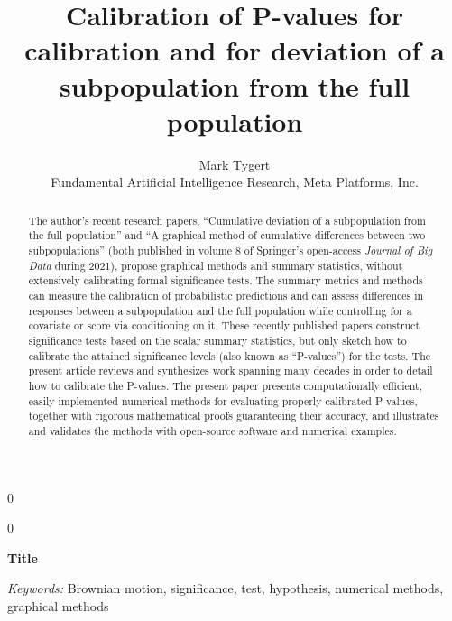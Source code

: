 \documentclass[12pt]{article}
\newcommand{\blind}{0}
\begin{document}
%

\def\spacingset#1{\renewcommand{\baselinestretch}%
{#1}\small\normalsize} \spacingset{1}



\blind
{
  \title{\bf Calibration of P-values for calibration and for deviation
         of a subpopulation from the full population}
  \author{Mark Tygert\\
          Fundamental Artificial Intelligence Research, Meta Platforms, Inc.}
  \maketitle
} \fi

\blind
{
  \bigskip
  \bigskip
  \bigskip
  \begin{center}
    {\LARGE\bf Title}
\end{center}
  \medskip
} \fi

\bigskip
\begin{abstract}
The author's recent research papers,
``Cumulative deviation of a subpopulation from the full population'' and
``A graphical method of cumulative differences between two subpopulations''
(both published in volume 8 of Springer's open-access {\it Journal of Big Data}
during 2021), propose graphical methods and summary statistics,
without extensively calibrating formal significance tests.
The summary metrics and methods can measure the calibration
of probabilistic predictions and can assess differences
in responses between a subpopulation and the full population while controlling
for a covariate or score via conditioning on it.
These recently published papers construct significance tests based
on the scalar summary statistics, but only sketch how to calibrate
the attained significance levels (also known as ``P-values'') for the tests.
The present article reviews and synthesizes work spanning many decades
in order to detail how to calibrate the P-values.
The present paper presents computationally efficient, easily implemented
numerical methods for evaluating properly calibrated P-values,
together with rigorous mathematical proofs guaranteeing their accuracy,
and illustrates and validates the methods with open-source software
and numerical examples.
\end{abstract}

\noindent%
{\it Keywords:} Brownian motion, significance, test, hypothesis,
                numerical methods, graphical methods
\vfill
\end{document}
